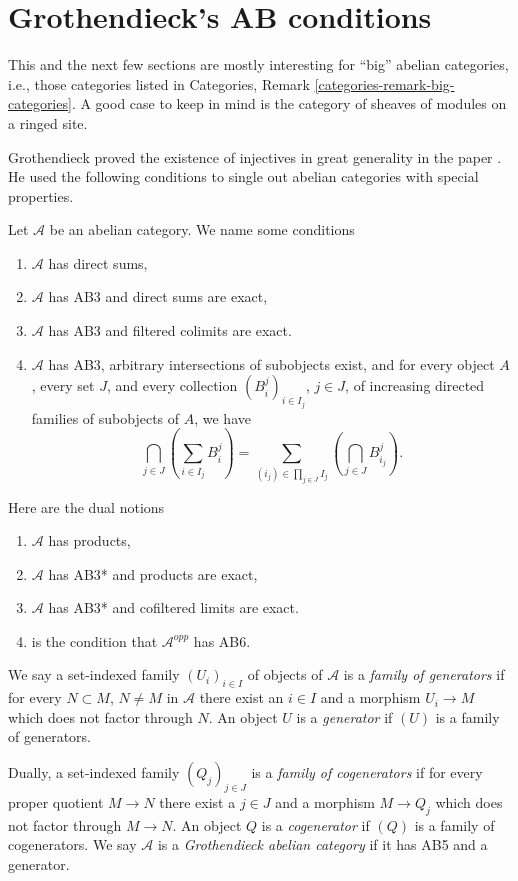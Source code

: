 \section{Grothendieck's AB conditions}
\label{section-grothendieck-conditions}

\noindent
This and the next few sections are mostly interesting for ``big'' abelian
categories, i.e., those categories listed in
Categories, Remark \ref{categories-remark-big-categories}.
A good case to keep in mind is the category of sheaves of modules
on a ringed site.

\medskip\noindent
Grothendieck proved the existence of injectives in great generality
in the paper \cite{Tohoku}. He used the following conditions to single
out abelian categories with special properties.

\begin{definition}
\label{definition-grothendieck-conditions}
\begin{reference}
\cite[Chapter I, \S 1.5, pp. 128--130]{Tohoku}
\end{reference}
Let $\mathcal{A}$ be an abelian category. We name some conditions
\begin{enumerate}
\item[AB3] $\mathcal{A}$ has direct sums,
\item[AB4] $\mathcal{A}$ has AB3 and direct sums are exact,
\item[AB5] $\mathcal{A}$ has AB3 and filtered colimits are exact.
\item[AB6] $\mathcal{A}$ has AB3, arbitrary intersections of subobjects
exist, and for every object $A$, every set $J$, and every collection
$(B_i^j)_{i \in I_j}$, $j \in J$, of increasing directed families of
subobjects of $A$, we have
$$
\bigcap_{j \in J}\left(\sum_{i \in I_j} B_i^j\right)
=
\sum_{(i_j) \in \prod_{j \in J} I_j}
\left(\bigcap_{j \in J} B_{i_j}^j\right).
$$
\end{enumerate}
Here are the dual notions
\begin{enumerate}
\item[AB3*] $\mathcal{A}$ has products,
\item[AB4*] $\mathcal{A}$ has AB3* and products are exact,
\item[AB5*] $\mathcal{A}$ has AB3* and cofiltered limits are exact.
\item[AB6*] is the condition that $\mathcal{A}^{opp}$ has AB6.
\end{enumerate}
We say a set-indexed family $(U_i)_{i \in I}$ of objects of $\mathcal{A}$
is a {\it family of generators} if for every $N \subset M$,
$N \not = M$ in $\mathcal{A}$ there exist an $i \in I$ and a morphism
$U_i \to M$ which does not factor through $N$. An object $U$ is a
{\it generator} if $(U)$ is a family of generators.

Dually, a set-indexed family $(Q_j)_{j \in J}$ is a
{\it family of cogenerators} if for every proper quotient $M \to N$
there exist a $j \in J$ and a morphism $M \to Q_j$ which does not factor
through $M \to N$. An object $Q$ is a {\it cogenerator} if $(Q)$ is a
family of cogenerators.
We say $\mathcal{A}$ is a {\it Grothendieck abelian category} if
it has AB5 and a generator.
\end{definition}

